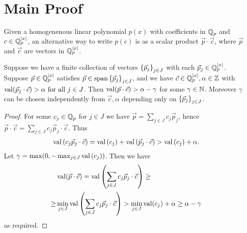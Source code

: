 
\section{Main Proof}
Given a homogenenous linear polynomial $p(x)$ with coefficients in $\mathbb{Q}_p$ and $c \in \mathbb{Q}_p^{|x|}$,
an alternative way to write $p(c)$ is as a scalar product $\vec p \cdot \vec c$,
where $\vec p$ and $\vec c$ are vectors in $\mathbb{Q}_p^{|x|}$.%

\begin{Lemma}	 
  Suppose we have a finite collection of vectors $\left\{\vec p_j\right\}_{j \in J}$ with each $\vec p_j \in \mathbb{Q}_p^{|x|}$.
  Suppose $\vec p \in \mathbb{Q}_p^{|x|}$ satisfies $\vec p \in \operatorname{span} \left\{\vec p_j\right\}_{j \in J}$,
  and we have $\vec c \in \mathbb{Q}_p^{|x|}, \alpha \in \mathbb{Z}$ with $\operatorname{val}(\vec p_j \cdot \vec c) > \alpha \text{ for all } j \in J$.
  Then $\operatorname{val}(\vec p \cdot \vec c) > \alpha - \gamma$ for some $\gamma \in \mathbb{N}$.
  Moreover $\gamma$ can be chosen independently from $\vec c, \alpha$ depending only on $\left\{\vec p_j\right\}_{j \in J}$.
\end{Lemma}

\begin{proof}
  For some $c_j \in \mathbb{Q}_p$ for $j \in J$ we have $\vec p = \sum_{j \in J} c_j \vec p_j$,
  hence $\vec p \cdot \vec c = \sum_{j \in J} c_j \vec p_j \cdot \vec c$.
  Thus
  \begin{align*}
    \operatorname{val} \left(c_j \vec p_j \cdot \vec c\right) = \operatorname{val} \left(c_j\right) + \operatorname{val} \left(\vec p_j \cdot \vec c\right) > \operatorname{val} \left(c_j\right) + \alpha.
  \end{align*}
  Let $\gamma = \max(0, -\max_{j \in J} \operatorname{val} \left(c_j\right))$.
  Then we have 
  \begin{align*}
    &\operatorname{val}(\vec p \cdot \vec c) =
      \operatorname{val} \left(\sum_{j \in J} c_j \vec p_j \cdot \vec c\right) \geq \\
      \geq &\min_{j \in J} \operatorname{val}\left(\sum_{j \in J} c_j \vec p_j \cdot \vec c\right) >
      \min_{j \in J} \operatorname{val}(c_j) + \alpha \geq
      \alpha - \gamma
  \end{align*}
  as required.
\end{proof}

